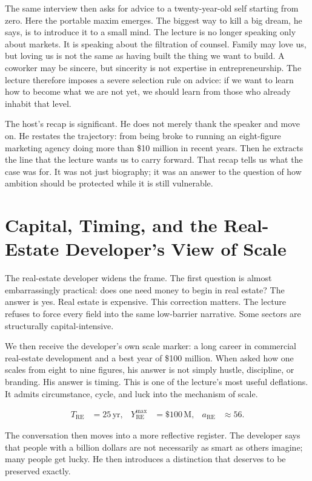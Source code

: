 The same interview then asks for advice to a twenty-year-old self starting from zero. Here the portable maxim emerges. The biggest way to kill a big dream, he says, is to introduce it to a small mind. The lecture is no longer speaking only about markets. It is speaking about the filtration of counsel. Family may love us, but loving us is not the same as having built the thing we want to build. A coworker may be sincere, but sincerity is not expertise in entrepreneurship. The lecture therefore imposes a severe selection rule on advice: if we want to learn how to become what we are not yet, we should learn from those who already inhabit that level.

The host's recap is significant. He does not merely thank the speaker and move on. He restates the trajectory: from being broke to running an eight-figure marketing agency doing more than \$10 million in recent years. Then he extracts the line that the lecture wants us to carry forward. That recap tells us what the case was for. It was not just biography; it was an answer to the question of how ambition should be protected while it is still vulnerable.

\section{Capital, Timing, and the Real-Estate Developer's View of Scale}

The real-estate developer widens the frame. The first question is almost embarrassingly practical: does one need money to begin in real estate? The answer is yes. Real estate is expensive. This correction matters. The lecture refuses to force every field into the same low-barrier narrative. Some sectors are structurally capital-intensive.

We then receive the developer's own scale marker: a long career in commercial real-estate development and a best year of \$100 million. When asked how one scales from eight to nine figures, his answer is not simply hustle, discipline, or branding. His answer is timing. This is one of the lecture's most useful deflations. It admits circumstance, cycle, and luck into the mechanism of scale.

\begin{align}
T_{\text{RE}} &= 25\,\text{yr}, &
Y^{\max}_{\text{RE}} &= \$100\,\mathrm{M}, &
a_{\text{RE}} &\approx 56.
\end{align}

The conversation then moves into a more reflective register. The developer says that people with a billion dollars are not necessarily as smart as others imagine; many people get lucky. He then introduces a distinction that deserves to be preserved exactly.

